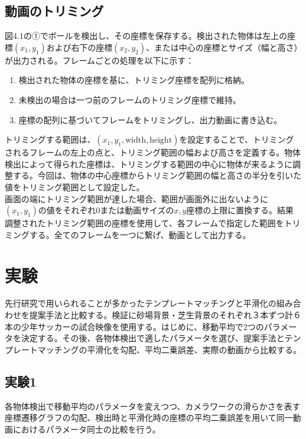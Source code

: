\documentclass[11pt,a4j]{jreport}
\begin{document}
\section{動画のトリミング}
図4.1の①でボールを検出し、その座標を保存する。検出された物体は左上の座標$(x_1, y_1)$および右下の座標$(x_2, y_2)$、または中心の座標とサイズ（幅と高さ）が出力される。フレームごとの処理を以下に示す：\\

\begin{enumerate}
    \item 検出された物体の座標を基に、トリミング座標を配列に格納。
    \item 未検出の場合は一つ前のフレームのトリミング座標で維持。
    \item 座標の配列に基づいてフレームをトリミングし、出力動画に書き込む。\\
\end{enumerate}

トリミングする範囲は、$(x_1, y_1, \text{width}, \text{height})$を設定することで、トリミングされるフレームの左上の点と、トリミング範囲の幅および高さを定義する。物体検出によって得られた座標は、トリミングする範囲の中心に物体が来るように調整する。今回は、物体の中心座標からトリミング範囲の幅と高さの半分を引いた値をトリミング範囲として設定した。\\
画面の端にトリミング範囲が達した場合、範囲が画面外に出ないように$(x_1, y_1)$の値をそれぞれ0または動画サイズの$x, y$座標の上限に置換する。結果調整されたトリミング範囲の座標を使用して、各フレームで指定した範囲をトリミングする。全てのフレームを一つに繋げ、動画として出力する。

\chapter{実験}
先行研究で用いられることが多かったテンプレートマッチングと平滑化の組み合わせを提案手法と比較する。検証に砂場背景・芝生背景のそれぞれ３本ずつ計６本の少年サッカーの試合映像を使用する。はじめに、移動平均で2つのパラメータを決定する。その後、各物体検出で適したパラメータを選び、提案手法とテンプレートマッチングの平滑化を勾配、平均二乗誤差、実際の動画から比較する。

\section{実験1}

各物体検出で移動平均のパラメータを変えつつ、カメラワークの滑らかさを表す座標遷移グラフの勾配、検出時と平滑化時の座標の平均二乗誤差を用いて同一動画におけるパラメータ同士の比較を行う。
\end{document}
